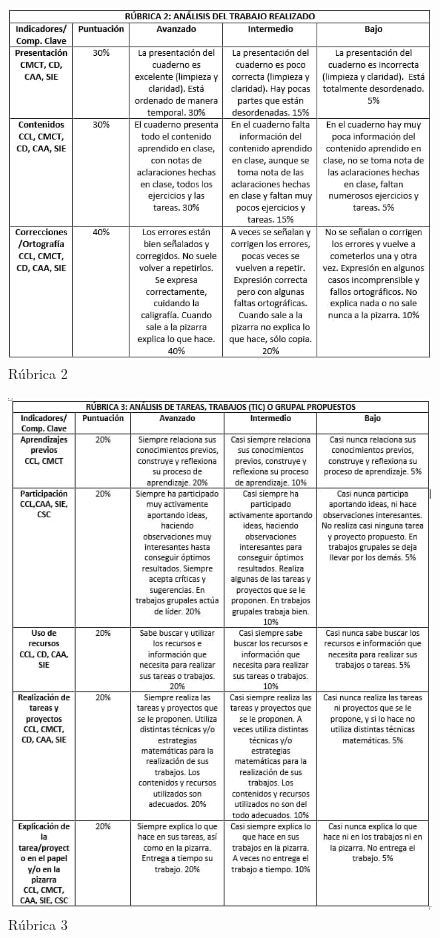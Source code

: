 \documentclass[../main.tex]{memoir}
\begin{document}
\begin{figure}[H]
	\centering
	\includegraphics[scale=0.8]{images/rub2.jpeg}
	\caption{Rúbrica 2}
	\label{rubrica2}
\end{figure}

\begin{figure}[H]
	\centering
	\includegraphics[scale=0.9]{images/rub3.jpeg}
	\caption{Rúbrica 3}
	\label{rubrica3}
\end{figure}
\end{document}
